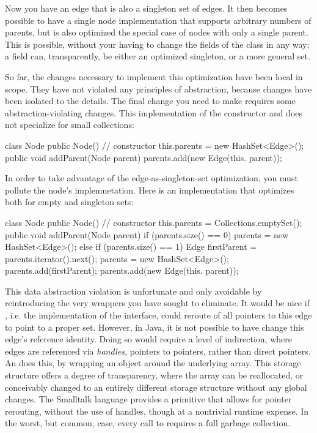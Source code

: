 Now you have an edge that is also a singleton set of edges. It then becomes
possible to have a single node implementation that supports arbitrary numbers of
parents, but is also optimized the special case of nodes with only a single
parent. This is possible, without your having to change the fields of the
 class in any way: a field  can,
transparently, be either an optimized singleton, or a more general set.

So far, the changes necessary to implement this optimization have been local in
scope. They have not violated any principles of abstraction, because changes have
been isolated to the  details. The final change you need to make
requires some abstraction-violating changes. This implementation of the
constructor and  does not specialize for small collections:

\begin{shortlisting}
class Node {
  public Node() { // constructor
     this.parents = new HashSet<Edge>();
  }
  public void addParent(Node parent) {
     parents.add(new Edge(this. parent));
  }
}
\end{shortlisting} 

In order to take advantage of the edge-as-singleton-set optimization, you must
pollute the node's  implemnetation. Here is an implementation
that optimizes both for empty and singleton sets:

\begin{shortlisting}
class Node {
  public Node() { // constructor
     this.parents = Collections.emptySet();
  }
  public void addParent(Node parent) {
     if (parents.size() == 0) parents = new HashSet<Edge>();
     else if (parents.size() == 1) {
        Edge firstParent = parents.iterator().next();
        parents = new HashSet<Edge>();
        parents.add(firstParent);
     }
     parents.add(new Edge(this. parent));
  }
}
\end{shortlisting} 

This data abstraction violation is unfortunate and only avoidable by
reintroducing the very wrappers you have sought to eliminate. It would be nice if
, i.e. the implementation of the  interface, could
reroute of all pointers to this edge to point to a proper set. However, in Java,
it is not possible to have  change this edge's reference
identity. Doing so would require a level of indirection, where edges are
referenced via \emph{handles}, pointers to pointers, rather than direct
pointers. An  does this, by wrapping an object
around the underlying array. This storage structure offers a degree of
transparency, where the array can be reallocated, or conceivably changed to an
entirely different storage structure without any global changes. The Smalltalk
language provides a 
primitive that allows for pointer rerouting,
without the use of handles, though at a nontrivial runtime expense. In the worst,
but common, case, every call to  requires a full garbage collection.

